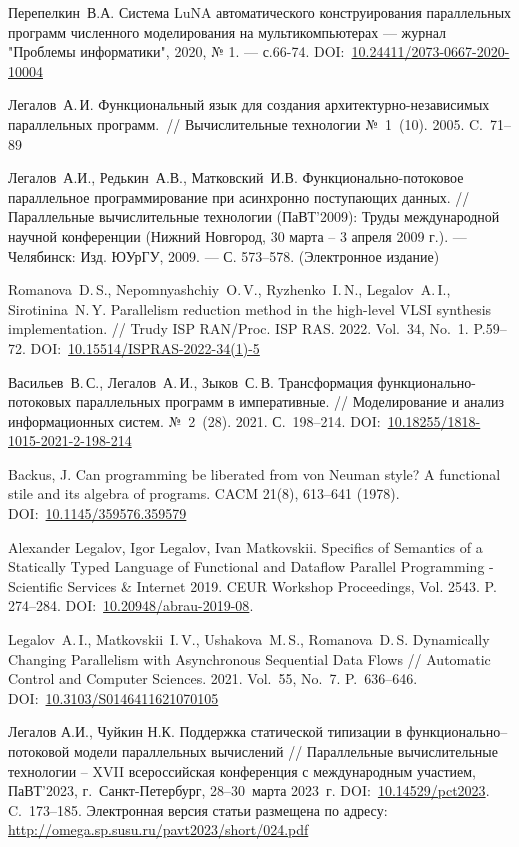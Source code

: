 \begin{thebibliography}{00}
Перепелкин~В.А.
Система LuNA автоматического конструирования параллельных программ численного моделирования на мультикомпьютерах --- журнал "Проблемы информатики", 2020, № 1. --- с.66-74. 
DOI:~\href{https://doi.org/10.24411/2073-0667-2020-10004}{10.24411/2073-0667-2020-10004}

Легалов~А.\,И. Функциональный язык для создания архитектурно-независимых параллельных программ.~//
Вычислительные технологии №~1~(10). 2005. C.~71--89

Легалов~А.И., Редькин~А.В., Матковский~И.В. Функционально-потоковое параллельное программирование при асинхронно поступающих данных. // Па\-рал\-лель\-ные вычислительные технологии (ПаВТ'2009): Труды международной научной конференции (Нижний Новгород, 30 марта – 3 апреля 2009 г.). 
--- Че\-ля\-бинск: Изд. ЮУрГУ, 2009. --- С. 573--578. (Электронное издание)

Romanova~D.\,S., Nepomnyashchiy~O.\,V., Ryzhenko~I.\,N., Legalov~A.\,I., Sirotinina~N.\,Y. Parallelism reduction method in the high-level VLSI synthesis implementation. // Trudy ISP RAN/Proc. ISP RAS. 2022. Vol.~34, No.~1. P.59--72. DOI:~\href{https://doi.org/10.15514/ISPRAS-2022-34(1)-5}{10.15514/ISPRAS-2022-34(1)-5}

Васильев~В.\,С., Легалов~А.\,И., Зыков~С.\,В. Трансформация функционально-потоковых параллельных программ в императивные. // Моделирование и анализ информационных систем. №~2~(28). 2021. С.~198--214. DOI:~\href{https://doi.org/10.18255/1818-1015-2021-2-198-214}{10.18255/1818-1015-2021-2-198-214}

Backus, J.
Can programming be liberated from von Neuman style? A functional
stile and its algebra of programs. CACM 21(8), 613–641 (1978). DOI:~\href{https://doi.org/10.1145/359576.359579}{10.1145/359576.359579}

Alexander Legalov, Igor Legalov, Ivan Matkovskii. Specifics of Semantics of a Statically Typed Language of Functional and Dataflow Parallel Programming - Scientific Services \& Internet 2019.  CEUR Workshop Proceedings, Vol. 2543. P. 274--284. DOI:~\href{https://doi.org/10.20948/abrau-2019-08}{10.20948/abrau-2019-08}.

Legalov~A.\,I., Matkovskii~I.\,V., Ushakova~M.\,S., Romanova~D.\,S. Dynamically Changing Parallelism with Asynchronous Sequential Data Flows // Automatic Control and Computer Sciences. 2021. Vol.~55, No.~7. P.~636--646. DOI:~\href{https://doi.org/10.3103/S0146411621070105}{10.3103/S0146411621070105}

Легалов А.И., Чуйкин Н.К. Поддержка статической типизации в функционально–потоковой модели параллельных вычислений // Параллельные вычислительные технологии – XVII всероссийская конференция с международным участием, ПаВТ'2023, г. Санкт-Петербург, 28–30 марта 2023 г. DOI:~\href{https://doi.org/10.14529/pct2023}{10.14529/pct2023}. C. 173–185. Электронная версия статьи размещена по адресу: \href{http://omega.sp.susu.ru/pavt2023/short/024.pdf}{http://omega.sp.susu.ru/pavt2023/short/024.pdf}
\end{thebibliography}
